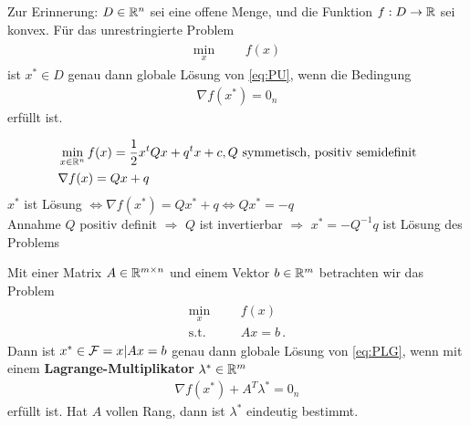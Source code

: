 Zur Erinnerung: $D \in \mathbb R^n$ sei eine offene Menge, und die Funktion $f: D \rightarrow \mathbb R$ sei konvex. Für das unrestringierte Problem
	\begin{gather*} 
	\label{eq:PU}
  		\tag{PU}
  			\begin{aligned}
    			\min_x
    			& & & f(x)
  			\end{aligned}
	\end{gather*}
ist $x^* \in D$ genau dann globale Lösung von \eqref{eq:PU}, wenn die Bedingung
\begin{align*}
\nabla f(x^*) = 0_n
\end{align*}
erfüllt ist.

\begin{Beispiel} 
  	\begin{align}
   		&\min_{x\in\mathbb R^n}
   		 f(x)=\frac{1}{2}x^tQx+q^tx+c, Q\text{ symmetisch, positiv semidefinit} \\
   		&\nabla f(x)=Qx+q
  	\end{align}
$x^*$ ist Lösung $\Leftrightarrow \nabla f(x^*)=Qx^*+q \Leftrightarrow Qx^*=-q$ \\
Annahme $Q$ positiv definit $\Rightarrow$ $Q$ ist invertierbar $\Rightarrow$ $x^*=-Q^{-1}q$ ist Lösung des Problems
\end{Beispiel} 

Mit einer Matrix $A \in \mathbb R^{m\times n}$ und einem Vektor $b \in \mathbb R^m$ betrachten wir das Problem
	\begin{gather*}
	\label{eq:PLG}
  		\tag{PLG}
  			\begin{aligned}
    			\min_x
    			& & & f(x) \\
    			\text{s.t.}
    			& & & Ax=b \,.
  			\end{aligned}
	\end{gather*}
Dann ist $x^* \in \mathcal{F} = {x | Ax = b}$ genau dann globale Lösung von \eqref{eq:PLG},
wenn mit einem \textbf{Lagrange-Multiplikator} $\lambda^* \in \mathbb R^m$
\begin{align*}
\nabla f(x^*)+A^T \lambda^* = 0_n
\end{align*}
erfüllt ist. Hat $A$ vollen Rang, dann ist $\lambda^*$ eindeutig bestimmt.

